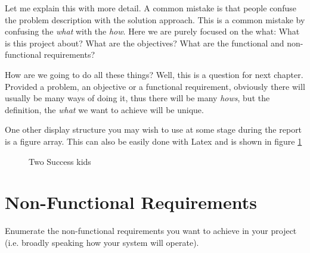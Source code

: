 Let me explain this with more detail. A common mistake is that people confuse the problem description with the solution approach. This is a common mistake by confusing the \emph{what} with the \emph{how}. Here we are purely focused on the what: What is this project about? What are the objectives? What are the functional and non-functional requirements? 

How are we going to do all these things? Well, this is a question for next chapter. Provided a problem, an objective or a functional requirement, obviously there will usually be many ways of doing it, thus there will be many \emph{hows}, but the definition, the \emph{what} we want to achieve will be unique.

One other display structure you may wish to use at some stage during the report is a figure array. This can also be easily done with Latex and is shown in figure \ref{fig:twosuccesskid}

\begin{figure}
\centering     %
{}
\caption{Two Success kids}
\label{fig:twosuccesskid}
\end{figure}

\section{Non-Functional Requirements}
Enumerate the non-functional requirements you want to achieve in your project (i.e. broadly speaking how your system will operate).


